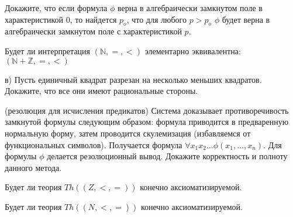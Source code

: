 \setcounter{curtask}{38}


\begin{task}
    Докажите, что если формула $\phi$ верна в алгебраически замкнутом
    поле в характеристикой 0, то найдется $p_o$, что для любого $p >
    p_o$ $\phi$ будет верна в алгебраически замкнутом поле с
    характеристикой $p$.
\end{task}

\breakline

\begin{ptask}{26}
    Будет ли интерпретация $(\mathbb{N}, =, <)$ элементарно
    эквивалентна: $(\mathbb{N} + \mathbb{Z}, =, <)$
\end{ptask}

\begin{ptask}{27}
    в) Пусть единичный квадрат разрезан на несколько меньших
    квадратов. Докажите, что все они имеют рациональные стороны.
\end{ptask}

\begin{ptask}{33}(резолюция для исчисления предикатов)
    Система доказывает противоречивость замкнутой формулы следующим
    образом: формула приводится в предваренную нормальную форму, затем
    проводится скулемизация (избавляемся от функциональных
    символов). Получается формула $\forall x_1 x_2 \dots
    \phi(x_1, \dots, x_n)$. Для формулы $\phi$ делается резолюционный
    вывод. Докажите корректность и полноту данного метода.
\end{ptask}

\begin{ptask}{36}
    Будет ли теория $Th((Z, <, =))$ конечно аксиоматизируемой.
\end{ptask}

\begin{ptask}{37}
    Будет ли теория $Th((N, <, =))$ конечно аксиоматизируемой.
\end{ptask}